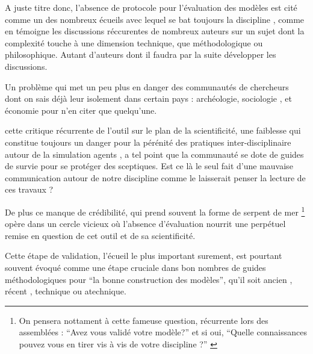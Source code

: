 A juste titre donc, l'absence de protocole pour l'évaluation des modèles est cité comme un des nombreux écueils avec lequel se bat toujours la discipline \autocite{Heath2009}, comme en témoigne les discussions réccurentes de nombreux auteurs sur un sujet dont la complexité touche à une dimension technique, que méthodologique ou philosophique. Autant d'auteurs \autocite{Richiardi2006} \autocite{Fagiolo2007} \autocite{Moss2008} \autocite{Windrum2007} \autocite{Barlas1996} \autocite{Amblard2003} \autocite{OSullivan2004} \autocite{Doran2000} \autocite{Crooks2012} \autocite{Rouchier2013} dont il faudra par la suite développer les discussions.  

Un problème qui met un peu plus en danger des communautés de chercheurs dont on sais déjà leur isolement dans certain pays : archéologie, sociologie \autocite{Manzo2007}, et économie \autocite{Lehtinen2007} \autocite{Richiardi2006} pour n'en citer que quelqu'une. 

cette critique récurrente de l'outil sur le plan de la scientificité, une faiblesse qui constitue toujours un danger pour la pérénité des pratiques inter-disciplinaire autour de la simulation agents \autocite[220]{Squazzoni2010}, a tel point que la communauté se dote de guides de survie pour se protéger des sceptiques. \autocite{Waldherr2013} Est ce là le seul fait d'une mauvaise communication autour de notre discipline comme le laisserait penser la lecture de ces travaux ? 

De plus ce manque de crédibilité, qui prend souvent la forme de serpent de mer \footnote{ On pensera nottament à cette fameuse question, récurrente lors des assemblées : \enquote{Avez vous validé votre modèle?} et si oui, \enquote{Quelle connaissances pouvez vous en tirer vis à vis de votre discipline ?} \autocite{Amblard2006} } opère dans un cercle vicieux où l'absence d'évaluation nourrit une perpétuel remise en question de cet outil et de sa scientificité. %

Cette étape de validation, l'écueil le plus important surement, est pourtant souvent évoqué comme une étape cruciale dans bon nombres de guides méthodologiques pour \enquote{la bonne construction des modèles}, qu'il soit ancien \autocite[195]{Beshers1965} \autocite{Naylor1966, Naylor1967}, récent \autocite{Amblard2006, Gilbert2008}, technique ou atechnique. 


